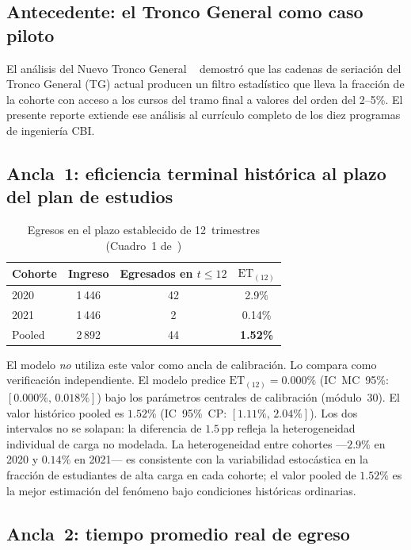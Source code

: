 \documentclass[11pt,letterpaper]{article}
\newcommand{\ET}[1]{\mathrm{ET}_{(#1)}}
\begin{document}
\subsection{Antecedente: el Tronco General como caso piloto}

El análisis del Nuevo Tronco General ~\cite{TGNA2026} demostró que las
cadenas de seriación del Tronco General (TG) actual producen un filtro estadístico que lleva
la fracción de la cohorte con acceso a los cursos del tramo final a valores
del orden del 2--5\%.
El presente reporte extiende ese análisis al currículo completo de los diez
programas de ingeniería CBI.

\subsection{Ancla~1: eficiencia terminal histórica al plazo del plan de estudios}

\begin{table}[H]\centering
\caption{Egresos en el plazo establecido de 12~trimestres
         (Cuadro~1 de~\cite{TGNA2026})}
\label{tab:historico}
\small
\begin{tabular}{lccc}
\toprule
Cohorte & Ingreso & Egresados en $t\leq12$ & $\ET{12}$ \\
\midrule
2020 & 1\,446 & 42 & 2.9\% \\
2021 & 1\,446 & \phantom{0}2 & 0.14\% \\
\midrule
Pooled & 2\,892 & 44 & \textbf{1.52\%} \\
\bottomrule
\end{tabular}
\end{table}

El modelo \emph{no} utiliza este valor como ancla de calibración.
Lo compara como verificación independiente.
El modelo predice $\ET{12}=0.000\%$
(IC~MC~95\%: $[0.000\%,\,0.018\%]$) bajo los parámetros centrales
de calibración (módulo~30).
El valor histórico pooled es $1.52\%$ (IC~95\%~CP: $[1.11\%,\,2.04\%]$).
Los dos intervalos no se solapan: la diferencia de $1.5\,\text{pp}$ refleja la
heterogeneidad individual de carga no modelada.
La heterogeneidad entre cohortes ---$2.9\%$ en 2020 y $0.14\%$ en 2021---
es consistente con la variabilidad estocástica en la fracción de estudiantes
de alta carga en cada cohorte; el valor pooled de $1.52\%$ es la mejor
estimación del fenómeno bajo condiciones históricas ordinarias.

\subsection{Ancla~2: tiempo promedio real de egreso}
\end{document}
